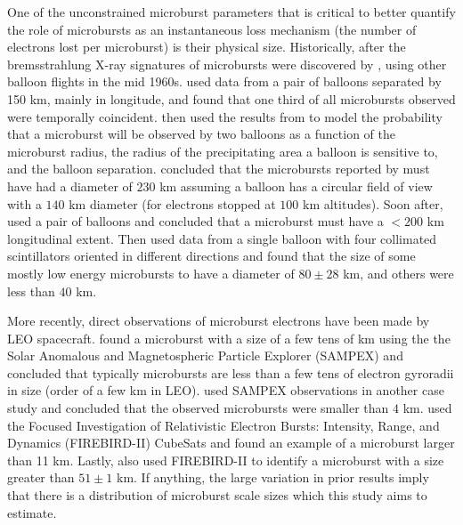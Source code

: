 \documentclass[draft]{agujournal2019}
\begin{document}
One of the unconstrained microburst parameters that is critical to better quantify the role of microbursts as an instantaneous loss mechanism (the number of electrons lost per microburst) is their physical size. Historically, after the bremsstrahlung X-ray signatures of microbursts were discovered by ,  using other balloon flights in the mid 1960s.  used data from a pair of balloons separated by 150 km, mainly in longitude, and found that one third of all microbursts observed were temporally coincident.  then used the results from  to model the probability that a microburst will be observed by two balloons as a function of the microburst radius, the radius of the precipitating area a balloon is sensitive to, and the balloon separation.  concluded that the microbursts reported by   must have had a diameter of $230$ km assuming a balloon has a circular field of view with a $140$ km diameter (for electrons stopped at $100$ km altitudes). Soon after,  used a pair of balloons and concluded that a microburst must have a $<200$ km longitudinal extent. Then  used data from a single balloon with four collimated scintillators oriented in different directions and found that the size of some mostly low energy microbursts to have a diameter of $80 \pm 28$ km, and others were less than $40$ km. 

More recently, direct observations of microburst electrons have been made by LEO spacecraft.  found a microburst with a size of a few tens of km using the the Solar Anomalous and Magnetospheric Particle Explorer (SAMPEX) and concluded that typically microbursts are less than a few tens of electron gyroradii in size (order of a few km in LEO).  used SAMPEX observations in another case study and concluded that the observed microbursts were smaller than $4$ km.  used the Focused Investigation of Relativistic Electron Bursts: Intensity, Range, and Dynamics (FIREBIRD-II) CubeSats and found an example of a microburst larger than 11 km. Lastly,  also used FIREBIRD-II to identify a microburst with a size greater than $ 51 \pm 1$ km. If anything, the large variation in prior results imply that there is a distribution of microburst scale sizes which this study aims to estimate.
\end{document}
